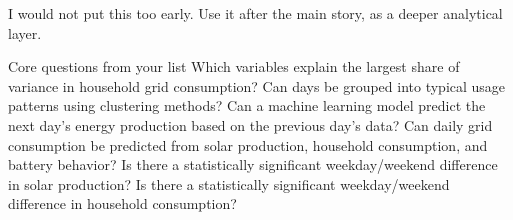 \documentclass[
]{article}
\begin{document}
I would not put this too early. Use it after the main story, as a deeper
analytical layer.

Core questions from your list Which variables explain the largest share
of variance in household grid consumption? Can days be grouped into
typical usage patterns using clustering methods? Can a machine learning
model predict the next day's energy production based on the previous
day's data? Can daily grid consumption be predicted from solar
production, household consumption, and battery behavior? Is there a
statistically significant weekday/weekend difference in solar
production? Is there a statistically significant weekday/weekend
difference in household consumption?
\end{document}
